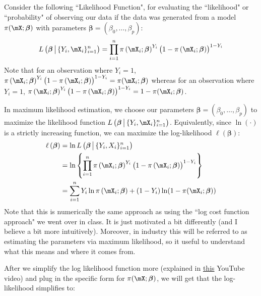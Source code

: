 \documentclass[10pt]{article}
\begin{document}
Consider the following ``Likelihood Function", for evaluating the ``likelihood" or ``probability" of observing our data if the data was generated from a model  \(\pi(\mX ;\boldsymbol{\beta})\) with parameters \(\boldsymbol{\beta} = \left(\beta_0, \dots, \beta_p\right)\):
\begin{equation}
	\label{eq:likelihood}
	L\left(\boldsymbol{\beta}\, \middle|\, \{Y_i, \mX_i\}_{i=1}^n \right) = \prod_{i=1}^n \pi\left(\mX_i;\boldsymbol{\beta}\right)^{Y_i}\left(1 - \pi\left(\mX_i ; \boldsymbol{\beta}\right)\right)^{1-Y_i}
\end{equation}
Note that for an observation where \(Y_i = 1\), \(\pi\left(\mX_i;\boldsymbol{\beta}\right)^{Y_i}\left(1 - \pi\left(\mX_i ; \boldsymbol{\beta}\right)\right)^{1-Y_i} = \pi(\mX_i;\boldsymbol{\beta})\) whereas for an observation where \(Y_i = 1\),  \(\pi\left(\mX_i;\boldsymbol{\beta}\right)^{Y_i}\left(1 - \pi\left(\mX_i ; \boldsymbol{\beta}\right)\right)^{1-Y_i} = 1 - \pi(\mX_i;\boldsymbol{\beta})\).

In maximum likelihood estimation, we choose our parameters \(\boldsymbol{\beta} = \left(\beta_0, \dots, \beta_p\right)\) to maximize the likelihood function \(L\left(\boldsymbol{\beta}\,\middle|\,\{Y_i,\mX_i\}_{i=1}^n \right)\). Equivalently, since \(\ln(\cdot)\) is a strictly increasing function, we can maximize the log-likelihood \(\ell(\boldsymbol{\beta})\):
\begin{align*}
	\ell\left(\boldsymbol{\beta}\right) &= \ln L\left(\boldsymbol{\beta}\,\middle|\,\{Y_i,X_i\}_{i=1}^n \right) \\ 
										&= \ln\left\{\prod_{i=1}^n \pi\left(\mX_i;\boldsymbol{\beta}\right)^{Y_i}\left(1 - \pi\left(\mX_i ; \boldsymbol{\beta}\right)\right)^{1-Y_i}\right\} \\
										&= \sum_{i=1}^n Y_i\ln\pi\left(\mX_i ;\boldsymbol{\beta}\right) + (1 - Y_i)\ln(1 - \pi(\mX_i;\boldsymbol{\beta}))
\end{align*}
Note that this is numerically the same approach as using the ``log cost function approach" we went over in class. It is just motivated a bit differently (and I believe a bit more intuitively). Moreover, in industry this will be referred to as estimating the parameters via maximum likelihood, so it useful to understand what this means and where it comes from. 

After we simplify the log likelihood function more (explained in \href{https://www.youtube.com/watch?v=YMJtsYIp4kg&t=351s}{this} YouTube video) and plug in the specific form for \(\pi(\mX;\boldsymbol{\beta})\), we will get that the log-likelihood simplifies to:
\end{document}
